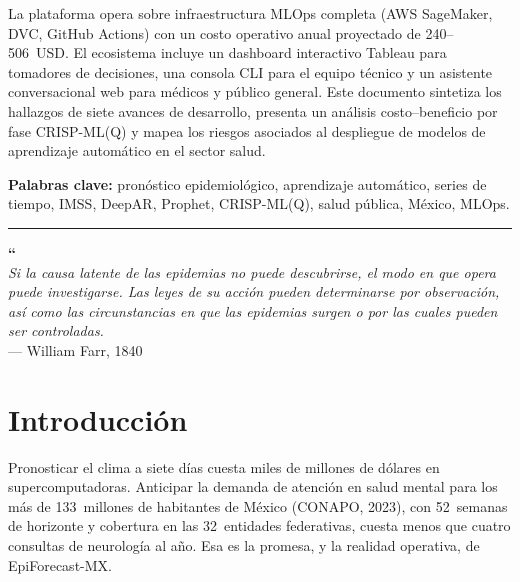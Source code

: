 \documentclass[12pt, letterpaper]{article}
\newcommand{\sepsection}{\vspace{0.5cm}\noindent\textcolor{coolgray}{\rule{\textwidth}{0.3pt}}\vspace{0.3cm}}
\begin{document}
La plataforma opera sobre infraestructura MLOps completa (AWS SageMaker, DVC, GitHub Actions) con un costo operativo anual proyectado de 240--506~USD. El ecosistema incluye un dashboard interactivo Tableau para tomadores de decisiones, una consola CLI para el equipo técnico y un asistente conversacional web para médicos y público general. Este documento sintetiza los hallazgos de siete avances de desarrollo, presenta un análisis costo--beneficio por fase CRISP-ML(Q) y mapea los riesgos asociados al despliegue de modelos de aprendizaje automático en el sector salud.

\vspace{0.5cm}
\noindent\textbf{\textcolor{burgundy}{Palabras clave:}} pronóstico epidemiológico, aprendizaje automático, series de tiempo, IMSS, DeepAR, Prophet, CRISP-ML(Q), salud pública, México, MLOps.

\sepsection

\newpage
\thispagestyle{empty}
\vspace*{\fill}
\begin{center}
\begin{minipage}{0.85\textwidth}
\begin{center}
{\color{burgundy}\fontsize{70}{70}\selectfont\textbf{``}}\\[0.5cm]
{\color{darkteal}\fontsize{18}{26}\selectfont\itshape
Si la causa latente de las epidemias no puede descubrirse, el modo en que opera puede investigarse. Las leyes de su acción pueden determinarse por observación, así como las circunstancias en que las epidemias surgen o por las cuales pueden ser controladas.}\\[0.8cm]
{\color{coolgray}\normalsize --- William Farr, 1840}
\end{center}
\end{minipage}
\end{center}
\vspace*{\fill}
\newpage

\section{Introducción}\label{sec:introduccion}

Pronosticar el clima a siete días cuesta miles de millones de dólares en supercomputadoras. Anticipar la demanda de atención en salud mental para los más de 133~millones de habitantes de México (CONAPO, 2023), con 52~semanas de horizonte y cobertura en las 32~entidades federativas, cuesta menos que cuatro consultas de neurología al año. Esa es la promesa, y la realidad operativa, de EpiForecast-MX.
\end{document}
